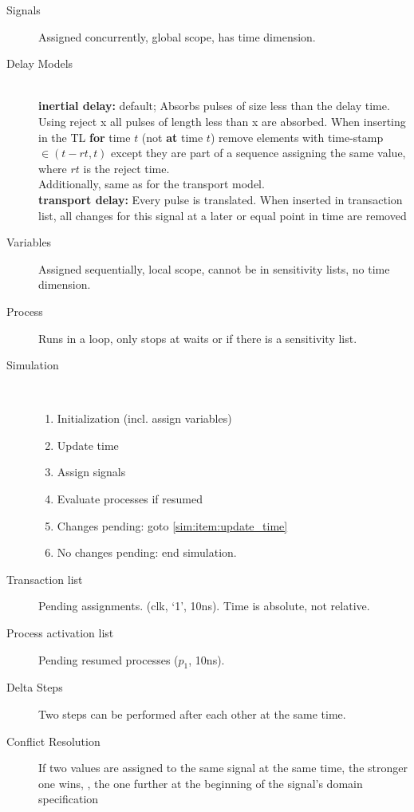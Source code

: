 \begin{description}
	\item[Signals] Assigned concurrently, global scope, has time dimension.
	\item[Delay Models] \ \\
	\textbf{inertial delay:} default; Absorbs pulses of size
	less than the delay time. Using reject x all pulses of length less than x are
	absorbed. When inserting in the TL \textbf{for} time $t$ (not \textbf{at} time
	$t$) remove elements with time-stamp $\in (t-rt, t)$ except they are part of a
	sequence assigning the same value, where $rt$ is the reject time.\\
	Additionally, same as for the transport model.\\
	\textbf{transport delay:} Every pulse is translated.
	When inserted in transaction list, all changes for this signal at a later or
	equal point in time are removed
	\item[Variables] Assigned sequentially, local scope, cannot be in sensitivity
	lists, no time dimension.
	\item[Process] Runs in a loop, only stops at waits or if there is a sensitivity
	list.
	\item[Simulation] \ 
	\begin{enumerate}
		\item Initialization (incl. assign variables)
		\item \label{sim:item:update_time}Update time
		\item Assign signals
		\item Evaluate processes if resumed
		\item Changes pending: goto \ref{sim:item:update_time}
		\item No changes pending: end simulation.
	\end{enumerate}
	\item[Transaction list] Pending assignments. 
	(clk, `1', 10ns). Time is absolute, not relative.
	\item[Process activation list] Pending resumed processes ($p_1$, 10ns).
	\item[Delta Steps] Two steps can be performed after each other at the same
	time.
	\item[Conflict Resolution] If two values are assigned to the same signal at the
	same time, the stronger one wins, \ie, the one further at the beginning of the
	signal's domain specification
\end{description}

